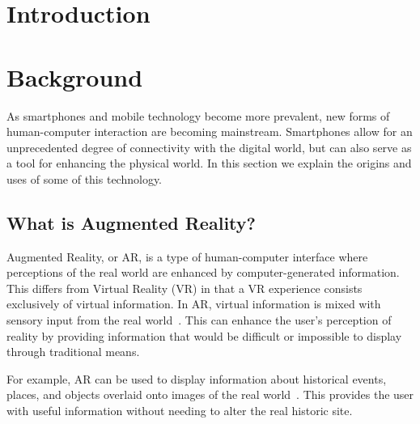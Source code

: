 \documentclass[a4paper, 10pt, american, titlepage]{article}
\begin{document}
\clearpage

{
\linespread{1}

\tableofcontents
{}
\newpage

\listoffigures
{}
\newpage

}


\section{Introduction}
\label{sec:introduction}

\section{Background}
\label{sec:background}

As smartphones and mobile technology become more prevalent,
new forms of human-computer interaction are becoming mainstream. Smartphones
allow for an unprecedented degree of connectivity with the digital world, but
can also serve as a tool for enhancing the physical world. In this section we
explain the origins and uses of some of this technology.

\subsection{What is Augmented Reality?}
\label{sec:whatIsAugmentedReality}

Augmented Reality, or AR, is a type of human-computer interface where
perceptions of the real world are enhanced by computer-generated information.
This differs from Virtual Reality (VR) in that a VR experience consists
exclusively of virtual information. In AR, virtual information is mixed with
sensory input from the real world~\autocite{carmigniani2011}. This can enhance
the user's perception of reality by providing information that would be
difficult or impossible to display through traditional means.

For example, AR can be used to display information about historical events,
places, and objects overlaid onto images of the real world~\autocite{saenz2009}.
This provides the user with useful information without needing to alter the real
historic site.
\end{document}
